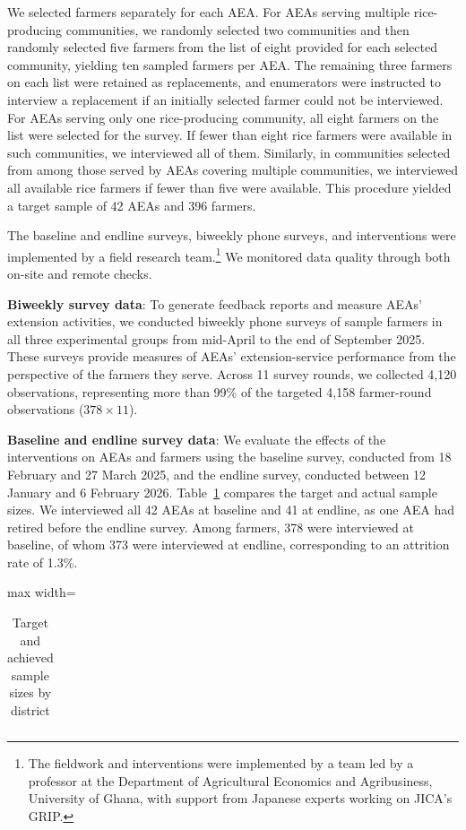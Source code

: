 \documentclass[11pt]{article}
\begin{document}
We selected farmers separately for each AEA. For AEAs serving multiple rice-producing communities, we randomly selected two communities and then randomly selected five farmers from the list of eight provided for each selected community, yielding ten sampled farmers per AEA. The remaining three farmers on each list were retained as replacements, and enumerators were instructed to interview a replacement if an initially selected farmer could not be interviewed. For AEAs serving only one rice-producing community, all eight farmers on the list were selected for the survey. If fewer than eight rice farmers were available in such communities, we interviewed all of them. Similarly, in communities selected from among those served by AEAs covering multiple communities, we interviewed all available rice farmers if fewer than five were available. This procedure yielded a target sample of 42 AEAs and 396 farmers.

The baseline and endline surveys, biweekly phone surveys, and interventions were implemented by a field research team.\footnote{The fieldwork and interventions were implemented by a team led by a professor at the Department of Agricultural Economics and Agribusiness, University of Ghana, with support from Japanese experts working on JICA's GRIP.} We monitored data quality through both on-site and remote checks. 

\textbf{Biweekly survey data}: To generate feedback reports and measure AEAs' extension activities, we conducted biweekly phone surveys of sample farmers in all three experimental groups from mid-April to the end of September 2025. These surveys provide measures of AEAs' extension-service performance from the perspective of the farmers they serve. Across 11 survey rounds, we collected 4,120 observations, representing more than 99\% of the targeted 4,158 farmer-round observations ($378 \times 11$).

\textbf{Baseline and endline survey data}: We evaluate the effects of the interventions on AEAs and farmers using the baseline survey, conducted from 18 February and 27 March 2025, and the endline survey, conducted between 12 January and 6 February 2026. Table~\ref{tab:obs} compares the target and actual sample sizes. We interviewed all 42 AEAs at baseline and 41 at endline, as one AEA had retired before the endline survey. Among farmers, 378 were interviewed at baseline, of whom 373 were interviewed at endline, corresponding to an attrition rate of 1.3\%.

\begin{table}[H]
\centering
\caption{Target and achieved sample sizes by district}
\label{tab:obs}
\begin{adjustbox}{max width=\linewidth}\scriptsize
\begin{tabular}{llccccccc}
\hline

\end{tabular}
\end{adjustbox}
\end{table}
\end{document}

